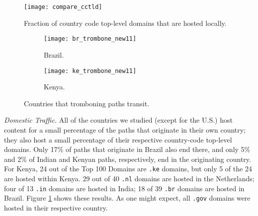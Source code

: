 \begin{figure}[t]
\centering
\texttt{[image: compare\_cctld]}
\caption{Fraction of country code top-level domains that are hosted locally. }%
\label{fig:cctld_graph}
\end{figure}

\begin{figure}[t!]
\centering
\begin{minipage}{\linewidth}
\begin{subfigure}[b]{.45\linewidth}
\texttt{[image: br\_trombone\_new11]}
\caption{Brazil.\label{fig:trombone_brazil}}
\end{subfigure}
\begin{subfigure}[b]{.45\linewidth}
\texttt{[image: ke\_trombone\_new11]}
\caption{Kenya.\label{fig:trombone_kenya}}
\end{subfigure}
\end{minipage}
\caption{Countries that tromboning paths transit.}
\label{fig:trombone}
\end{figure}




{\it Domestic Traffic.}
All of the countries we studied (except for the U.S.) host content for a small percentage 
of the paths that originate in their own country; they also host a small percentage of 
their respective country-code top-level domains.  Only 17\% of paths that originate in 
Brazil also end there, and only 5\% and 2\% of Indian and Kenyan paths, respectively, 
end in the originating country.  For Kenya, 24 out of the Top 100 Domains are {\tt .ke} 
domains, but only 5 of the 24 are hosted within Kenya.  29 out of 40 {\tt .nl} domains 
are hosted in the Netherlands; four of 13 {\tt .in} domains are hosted in India; 18 of 
39 {\tt .br} domains are hosted in Brazil.  Figure \ref{fig:cctld_graph} shows these 
results.  As one might expect, all {\tt .gov} domains were hosted in their respective country. 

